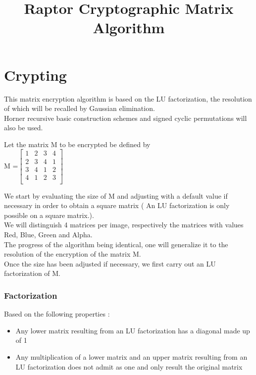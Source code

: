 \documentclass{article}
\begin{document}
\title{Raptor Cryptographic Matrix Algorithm}
\newpage
\part{Crypting}

\begin{flushleft}

This matrix encryption algorithm is based on the LU factorization, the resolution of which will be recalled by Gaussian elimination.
\newline
\\
Horner recursive basic construction schemes and signed cyclic permutations will also be used.
\end{flushleft}
\begin{center}
Let the matrix M to be encrypted be defined by
\newline
\\
M =$
\begin{bmatrix}
	1&2&3&4\\
	2&3&4&1\\
	3&4&1&2\\
	4&1&2&3\\
\end{bmatrix}$
\end{center}
\begin{flushleft}
We start by evaluating the size of M and adjusting with a default value if necessary in order to obtain a square matrix (
An LU factorization is only possible on a square matrix.).
\newline
\\
We will distinguish 4 matrices per image, respectively the matrices with values Red,  Blue, Green and Alpha.
\newline
\\
 The progress of the algorithm being identical, one will generalize it to the resolution of the encryption of the matrix M.
 \newline
 \\
Once the size has been adjusted if necessary, we first carry out an LU factorization of M.
\end{flushleft}
\newpage
 \section*{Factorization}
 Based on the following properties : 
 \begin{itemize}
 	\item Any lower matrix resulting from an LU factorization has a diagonal made up of 1
 	\item Any multiplication of a lower matrix and an upper matrix resulting from an LU factorization does not admit as one and only result the original matrix
 \end{itemize}
\end{document}
